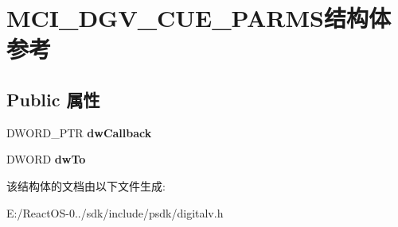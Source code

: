 \hypertarget{struct_m_c_i___d_g_v___c_u_e___p_a_r_m_s}{}\section{M\+C\+I\+\_\+\+D\+G\+V\+\_\+\+C\+U\+E\+\_\+\+P\+A\+R\+M\+S结构体 参考}
\label{struct_m_c_i___d_g_v___c_u_e___p_a_r_m_s}
\subsection*{Public 属性}
\begin{DoxyCompactItemize}
\item 
\mbox{\label{struct_m_c_i___d_g_v___c_u_e___p_a_r_m_s_a2db88c95e6eb6bb4b1ffd1da1ae498c2}} 
D\+W\+O\+R\+D\+\_\+\+P\+TR {\bfseries dw\+Callback}
\item 
\mbox{\label{struct_m_c_i___d_g_v___c_u_e___p_a_r_m_s_a4601533a329ce58ed30621fc5a1384f8}} 
D\+W\+O\+RD {\bfseries dw\+To}
\end{DoxyCompactItemize}


该结构体的文档由以下文件生成\+:\begin{DoxyCompactItemize}
\item 
E\+:/\+React\+O\+S-\/0../sdk/include/psdk/digitalv.\+h\end{DoxyCompactItemize}
